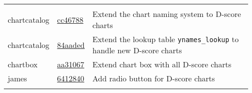 \documentclass[]{book}
\begin{document}
\begin{longtable}[]{@{}lll@{}}
\begin{minipage}[t]{0.36\columnwidth}
\end{minipage}\tabularnewline
\begin{minipage}[t]{0.26\columnwidth}\raggedright
chartcatalog\strut
\end{minipage} & \begin{minipage}[t]{0.29\columnwidth}\raggedright
\href{https://github.com/stefvanbuuren/chartcatalog/commit/cc467888dd5346d7ed2c0a78b976a8fa818f712c}{cc46788}\strut
\end{minipage} & \begin{minipage}[t]{0.36\columnwidth}\raggedright
Extend the chart naming system to D-score charts\strut
\end{minipage}\tabularnewline
\begin{minipage}[t]{0.26\columnwidth}\raggedright
chartcatalog\strut
\end{minipage} & \begin{minipage}[t]{0.29\columnwidth}\raggedright
\href{https://github.com/stefvanbuuren/chartcatalog/commit/84aaded206a5050660bd347d2e093af93b6b7ae1}{84aaded}\strut
\end{minipage} & \begin{minipage}[t]{0.36\columnwidth}\raggedright
Extend the lookup table \texttt{ynames\_lookup} to handle new D-score charts\strut
\end{minipage}\tabularnewline
\begin{minipage}[t]{0.26\columnwidth}\raggedright
chartbox\strut
\end{minipage} & \begin{minipage}[t]{0.29\columnwidth}\raggedright
\href{https://github.com/stefvanbuuren/chartbox/commit/aa310672a717f9777e2daac409d5ec40f3db509f}{aa31067}\strut
\end{minipage} & \begin{minipage}[t]{0.36\columnwidth}\raggedright
Extend chart box with all D-score charts\strut
\end{minipage}\tabularnewline
\begin{minipage}[t]{0.26\columnwidth}\raggedright
james\strut
\end{minipage} & \begin{minipage}[t]{0.29\columnwidth}\raggedright
\href{https://github.com/stefvanbuuren/james/commits/dscore}{6412840}\strut
\end{minipage} & \begin{minipage}[t]{0.36\columnwidth}\raggedright
Add radio button for D-score charts\strut
\end{minipage}\tabularnewline
\begin{minipage}[t]{0.26\columnwidth}\raggedright

\end{minipage}
\end{longtable}
\end{document}
